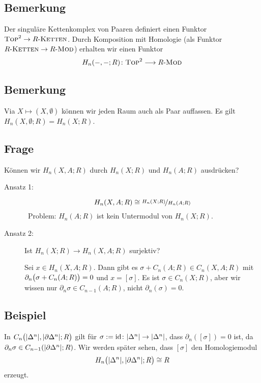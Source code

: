 \subsection[Definition: Der singuläre Kettenkomplex von Paaren definiert einen Funktor]{Bemerkung} %
\label{sub:83}
Der singuläre Kettenkomplex von Paaren definiert einen Funktor $\TOP^2 \to R\text{-}\textsc{Ketten}$. Durch Komposition mit Homologie (als Funktor 
$R\text{-}\textsc{Ketten} \to R\text{-}\MOD$) erhalten wir einen Funktor
\[
	H_n(-,-;R) \colon \TOP^2 \longrightarrow R\text{-}\MOD
\]

\subsection[Bemerkung: Topologische Räume als Paar auffassen]{Bemerkung} %
\label{sub:84}
Via $X \mapsto (X,\emptyset)$ können wir jeden Raum auch als Paar auffassen. Es gilt $H_n(X,\emptyset;R) = H_n(X;R)$.

\subsection[Frage: Können wir $H_n(X,A;R)$ durch $H_n(X;R)$ und $H_n(A;R)$ ausdrücken?]{Frage} %
\label{sub:85}
Können wir $H_n(X,A;R)$ durch $H_n(X;R)$ und $H_n(A;R)$ ausdrücken? 
\begin{description}
	\item[Ansatz 1:] 
	\[
		H_n(X,A;R) \cong \nicefrac{H_n(X;R)}{H_n(A;R)}
	\]
	\ifxetexorluatex \faWarning \, \fi Problem: $H_n(A;R)$ ist kein Untermodul von $H_n(X;R)$.
	\item[Ansatz 2:] Ist $H_n(X;R) \to H_n(X,A;R)$ surjektiv?
	
	Sei $x \in H_n(X,A;R)$. Dann gibt es $\sigma + C_n(A;R) \in C_n(X,A;R)$ mit $\partial_n \enbrace[\big]{\sigma + C_n(A;R)} = 0$ und $x= [\sigma]$. Es ist 
	$\sigma \in C_n(X;R)$, aber wir wissen nur $\partial_n \sigma \in C_{n-1}(A;R)$, nicht $\partial_n(\sigma)= 0$. \hfill \ifxetexorluatex {\large \faMehO} \fi
\end{description}

\subsection[Beispiel: Homologie des Paares $(\abs*{\Delta^n}, \abs*{\partial \Delta^n})$]{Beispiel} %
\label{sub:86}
In $C_n \enbrace[\big]{\abs*{\Delta^n}, \abs*{\partial \Delta^n};R}$ gilt für $\sigma := \id \colon \abs*{\Delta^n} \to \abs*{\Delta^n}$, dass $\partial_n([\sigma])=0$ ist, da 
$\partial_n \sigma \in C_{n-1} \enbrace*{\abs*{\partial \Delta^n};R}$. Wir werden später sehen, dass $[\sigma]$ den Homologiemodul
\[
	H_n \enbrace[\big]{\abs*{\Delta^n}, \abs*{\partial \Delta^n};R  } \cong R 
\]
erzeugt.

